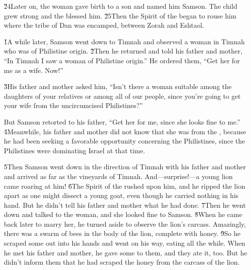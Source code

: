 \v{24}Later on, the woman gave birth to a son and named him Samson. The child grew strong and the  blessed him. \v{25}Then the Spirit of the  began to rouse him where the tribe of Dan was encamped, between Zorah and Eshtaol.

\v{1}A while later, Samson went down to Timnah and observed a woman in Timnah who was of Philistine origin. \v{2}Then he returned and told his father and mother, ``In Timnah I saw a woman of Philistine origin.'' He ordered them, ``Get her for me as a wife. Now!''

\v{3}His father and mother asked him, ``Isn't there a woman suitable among the daughters of your relatives or among all of our people, since you're going to get your wife from the uncircumcised Philistines?''

But Samson retorted to his father, ``Get her for me, since she looks fine to me.'' \v{4}Meanwhile, his father and mother did not know that she was from the , because he had been seeking a favorable opportunity concerning the Philistines, since the Philistines were dominating Israel at that time.

\v{5}Then Samson went down in the direction of Timnah with his father and mother and arrived as far as the vineyards of Timnah. And---surprise!---a young lion came roaring at him! \v{6}The Spirit of the  rushed upon him, and he ripped the lion apart as one might dissect a young goat, even though he carried nothing in his hand. But he didn't tell his father and mother what he had done. \v{7}Then he went down and talked to the woman, and she looked fine to Samson. \v{8}When he came back later to marry her, he turned aside to observe the lion's carcass. Amazingly, there was a swarm of bees in the body of the lion, complete with honey. \v{9}So he scraped some out into his hands and went on his way, eating all the while. When he met his father and mother, he gave some to them, and they ate it, too. But he didn't inform them that he had scraped the honey from the carcass of the lion.

